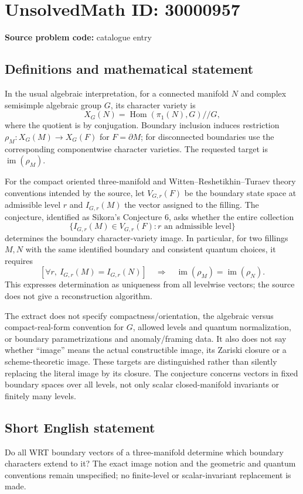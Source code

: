 \documentclass[11pt]{article}
\begin{document}
\section*{UnsolvedMath ID: 30000957}
\textbf{Source problem code:} catalogue entry
\subsection{Definitions and mathematical statement}
In the usual algebraic interpretation, for a connected manifold $N$ and complex semisimple algebraic group $G$, its character variety is
\[
X_G(N)=\operatorname{Hom}(\pi_1(N),G)//G,
\]
where the quotient is by conjugation. Boundary inclusion induces restriction $\rho_M:X_G(M)\to X_G(F)$ for $F=\partial M$; for disconnected boundaries use the corresponding componentwise character varieties. The requested target is $\operatorname{im}(\rho_M)$.

For the compact oriented three-manifold and Witten--Reshetikhin--Turaev theory conventions intended by the source, let $V_{G,r}(F)$ be the boundary state space at admissible level $r$ and $I_{G,r}(M)$ the vector assigned to the filling. The conjecture, identified as Sikora's Conjecture 6, asks whether the entire collection
\[
\{I_{G,r}(M)\in V_{G,r}(F):r\text{ an admissible level}\}
\]
determines the boundary character-variety image. In particular, for two fillings $M,N$ with the same identified boundary and consistent quantum choices, it requires
\[
\left[\forall r,\ I_{G,r}(M)=I_{G,r}(N)\right]
\quad\Longrightarrow\quad
\operatorname{im}(\rho_M)=\operatorname{im}(\rho_N).
\]
This expresses determination as uniqueness from all levelwise vectors; the source does not give a reconstruction algorithm.

The extract does not specify compactness/orientation, the algebraic versus compact-real-form convention for $G$, allowed levels and quantum normalization, or boundary parametrizations and anomaly/framing data. It also does not say whether ``image'' means the actual constructible image, its Zariski closure or a scheme-theoretic image. These targets are distinguished rather than silently replacing the literal image by its closure. The conjecture concerns vectors in fixed boundary spaces over all levels, not only scalar closed-manifold invariants or finitely many levels.
\subsection{Short English statement}
Do all WRT boundary vectors of a three-manifold determine which boundary characters extend to it? The exact image notion and the geometric and quantum conventions remain unspecified; no finite-level or scalar-invariant replacement is made.
\end{document}
